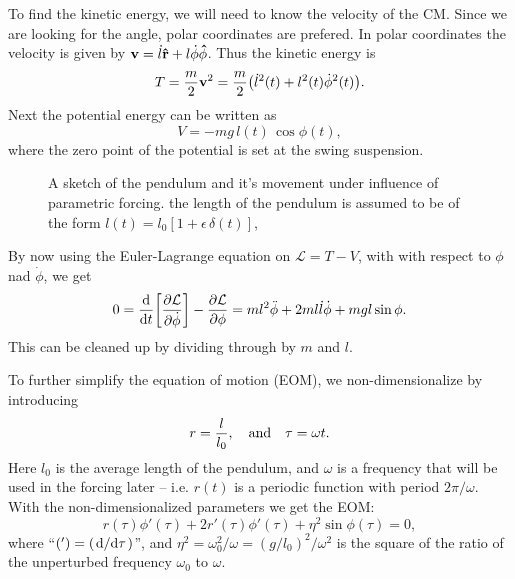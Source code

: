 \documentclass[11pt,letter, swedish, english
]{article}
\begin{document}
To find the kinetic energy, we will need to know the velocity of the
CM. Since we are looking for the angle, polar coordinates
are prefered. In polar coordinates the velocity is given by
$\vb{v}=\dot{l}\vu{r}+l\dot{\phi}\vu{\phi}$. Thus the kinetic energy is
\begin{equation}
T=\frac{m}{2}\vb{v}^2=\frac{m}{2}\qty(\dot{l}^2(t)+l^2(t)\dot{\phi}^2(t)).
\end{equation}
Next the potential energy can be written as
\begin{equation}
V=-mg\,l(t)\,\cos\phi(t),
\end{equation}
where the zero point of the potential is set at the swing suspension. 

\begin{figure}\centering
\resizebox{.2\textwidth}{!}{}
\caption{A sketch of the pendulum and it's movement under influence of
parametric forcing. the length of the pendulum is assumed to be of the
form $l(t)=l_0[1+\epsilon\,\delta(t)]$, 
}
\label{fig:pendulum}
\end{figure}

By now using the Euler-Lagrange equation on $\mathcal{L}=T-V$, with
with respect to $\phi$ nad $\dot\phi$, we get
\begin{equation}
0=\dv{t}\qty[\pdv{\mathcal{L}}{\dot{\phi}}]-\pdv{\mathcal{L}}{\phi}
=ml^2\ddot\phi +2ml\dot{l}\dot\phi +mgl\sin\phi.
\end{equation}
This can be cleaned up by dividing through by $m$ and $l$. 

To further simplify the equation of motion (EOM), we
non-dimensionalize by introducing
\begin{equation}
r=\frac{l}{l_0}\qcomma\text{and}\quad
\tau=\omega t.
\end{equation}
Here $l_0$ is the average length of the pendulum, and $\omega$ is a
frequency that will be used in the forcing later -- i.e. $r(t)$ is a
periodic function with period $2\pi/\omega$. 
With the non-dimensionalized parameters we get the EOM:
\begin{equation}\label{eq:eom2}
r(\tau)\phi'(\tau)+2r'(\tau)\phi'(\tau) + \eta^2\sin\phi(\tau)=0,
\end{equation}
where ``$(')=(\dv*{\tau})$'', and
$\eta^2=\omega_0^2/\omega=(g/l_0)^2/\omega^2$ is the square of the
ratio of the unperturbed frequency $\omega_0$ to $\omega$.
\end{document}
